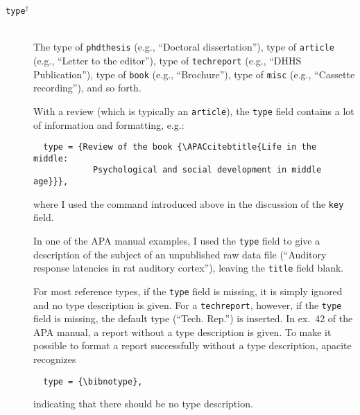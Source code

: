 \documentclass{article}
\newcommand{\LC}{\mbox{${}^{\dag}$}}%
\newcommand{\pkg}[1]{\textsf{#1}}%
\newcommand{\fieldname}[1]{\texttt{#1}}%
\newcommand{\entryname}[1]{\texttt{#1}}%
\newcommand{\cmd}[1]{\texttt{\string#1}}%
\begin{document}
\begin{description}
    \item[\fieldname{type}\LC] \mbox{}\\
        The type of \entryname{phdthesis} (e.g.,
        ``Doctoral dissertation''), type of \entryname{article}
        (e.g., ``Letter to the editor''), type of \entryname{techreport}
        (e.g., ``DHHS Publication''), type of \entryname{book}
        (e.g., ``Brochure''), type of \entryname{misc}
        (e.g., ``Cassette recording''), and so forth.

        With a review (which is typically an \entryname{article}),
        the \fieldname{type} field contains a lot of information
        and formatting, e.g.:
\begin{verbatim}
  type = {Review of the book {\APACcitebtitle{Life in the middle:
            Psychological and social development in middle age}}},
\end{verbatim}
        where I used the \cmd{\APACcitebtitle} command introduced above in
        the discussion of the \fieldname{key} field.

        In one of the APA manual examples, I used the \fieldname{type}
        field to give a description of the subject of an unpublished
        raw data file (``Auditory response latencies in rat auditory
        cortex''), leaving the \fieldname{title} field blank.

        For most reference types, if the \fieldname{type} field
        is missing, it is simply ignored and no type description
        is given. For a \entryname{techreport}, however, if the
        \fieldname{type} field is missing, the default type
        (``Tech. Rep.'') is inserted. In ex.~42 of the APA manual,
        a report without a type description is given. To make it
        possible to format a report successfully without a
        type description, \pkg{apacite} recognizes
\begin{verbatim}
  type = {\bibnotype},
\end{verbatim}
        indicating that there should be no type description.


\end{description}
\end{document}
